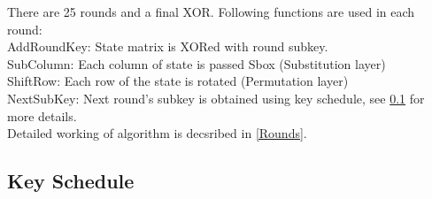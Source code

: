 \documentclass[final]{transcrypto}
\begin{document}
\newline
There are 25 rounds and a final XOR. Following functions are used in each round:\\
AddRoundKey: State matrix is XORed with round subkey.\\
SubColumn: Each column of state is passed Sbox (Substitution layer)\\
ShiftRow: Each row of the state is rotated (Permutation layer)\\
NextSubKey: Next round's subkey is obtained using key schedule, see \ref{KeySchedule} for more details.\\
Detailed working of algorithm is decsribed in \ref{Rounds}.
\subsection{Key Schedule}
\label{KeySchedule}
\end{document}
